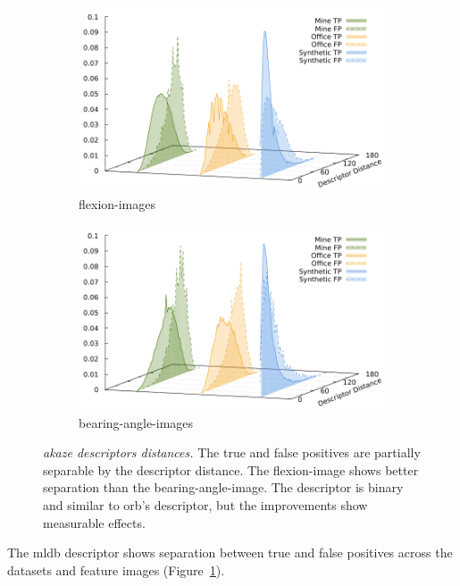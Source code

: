 \begin{figure}[b!]
\begin{subfigure}[t]{0.45\linewidth}
    \includegraphics[width=\linewidth]{chapter06/results/AKAZE/flexion/descriptor_distances.pdf}%
    \caption{\glspl{flexion-image}}
\end{subfigure}\quad
\begin{subfigure}[t]{0.45\linewidth}
    \includegraphics[width=\linewidth]{chapter06/results/AKAZE/bearing/descriptor_distances.pdf}%
    \caption{\glspl{bearing-angle-image}}
\end{subfigure}
\caption[\acrshort{akaze} descriptors distances]{\emph{\acrshort{akaze} descriptors distances.} The true and false positives are partially separable by the descriptor distance. The \gls{flexion-image} shows better separation than the \gls{bearing-angle-image}. The descriptor is binary and similar to \acrshort{orb}'s descriptor, but the improvements show measurable effects.}\label{fig:descriptor_akaze}
\end{figure}
The \acrshort{mldb} descriptor shows separation between true and false positives across the datasets and feature images (Figure~\ref{fig:descriptor_akaze}).
